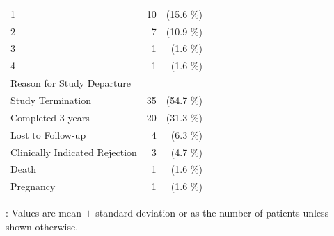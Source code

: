 \begin{table}[tbp]
\begin{tabular}{lrr}
        \hspace{2em}1 & 10 & (15.6 \%)\\
        \hspace{2em}2 & 7 & (10.9 \%)\\
        \hspace{2em}3 & 1 & (1.6 \%)\\
        \hspace{2em}4 & 1 & (1.6 \%)\\
        Reason for Study Departure & & \\
        \hspace{2em}Study Termination & 35 & (54.7 \%)\\
        \hspace{2em}Completed 3 years & 20 & (31.3 \%)\\
        \hspace{2em}Lost to Follow-up & 4 & (6.3 \%)\\
        \hspace{2em}Clinically Indicated Rejection & 3 & (4.7 \%)\\
        \hspace{2em}Death & 1 & (1.6 \%)\\
        \hspace{2em}Pregnancy & 1 & (1.6 \%)\\
        \bottomrule
    \end{tabular}
    \par\vspace{0.5em}
    \noindent*: Values are mean $\pm$ standard deviation or as the number of patients unless shown otherwise.
    \label{tbl:demographics}
\end{table}